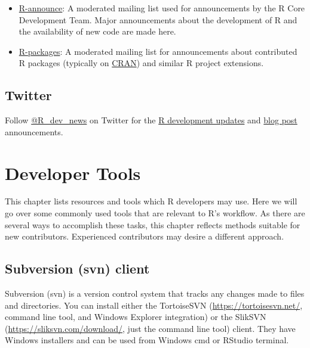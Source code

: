 \documentclass[
]{book}
\providecommand{\tightlist}{%
  \setlength{\itemsep}{0pt}\setlength{\parskip}{0pt}}
\begin{document}
\begin{itemize}
\tightlist
\item
  \href{https://stat.ethz.ch/mailman/listinfo/r-announce}{R-announce}: A moderated mailing list used for announcements by the R Core Development Team. Major announcements about the development of R and the availability of new code are made here.
\item
  \href{https://stat.ethz.ch/mailman/listinfo/r-packages}{R-packages}: A moderated mailing list for announcements about contributed R packages (typically on \href{https://cran.r-project.org/}{CRAN}) and similar R project extensions.
\end{itemize}

\hypertarget{twitter}{%
\section{Twitter}\label{twitter}}

Follow \href{https://twitter.com/R_dev_news}{@R\_dev\_news} on Twitter for the \href{https://developer.r-project.org/RSSfeeds.html}{R development updates} and \href{https://developer.r-project.org/Blog/public/}{blog post} announcements.

\hypertarget{DevTools}{%
\chapter{Developer Tools}\label{DevTools}}

This chapter lists resources and tools which R developers may use. Here we will go over some commonly used tools that are relevant to R's workflow. As there are several ways to accomplish these tasks, this chapter reflects methods suitable for new contributors. Experienced contributors may desire a different approach.

\hypertarget{subversion-svn-client}{%
\section{Subversion (svn) client}\label{subversion-svn-client}}

Subversion (svn) is a version control system that tracks any changes made to files and directories. You can install either the TortoiseSVN (\url{https://tortoisesvn.net/}, command line tool, and Windows Explorer integration) or the SlikSVN (\url{https://sliksvn.com/download/}, just the command line tool) client. They have Windows installers and can be used from Windows cmd or RStudio terminal.
\end{document}

